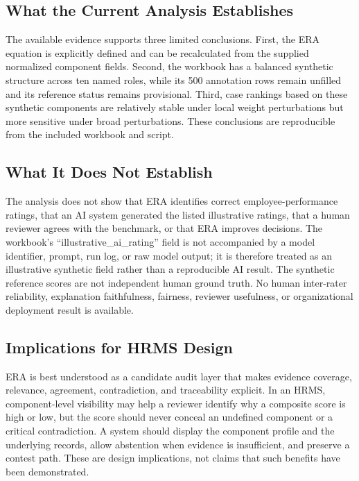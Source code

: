 \documentclass[
  10pt,
  runningheads]{llncs}
\begin{document}
\subsection{What the Current Analysis
Establishes}\label{what-the-current-analysis-establishes}

The available evidence supports three limited conclusions. First, the
ERA equation is explicitly defined and can be recalculated from the
supplied normalized component fields. Second, the workbook has a
balanced synthetic structure across ten named roles, while its 500
annotation rows remain unfilled and its reference status remains
provisional. Third, case rankings based on these synthetic components
are relatively stable under local weight perturbations but more
sensitive under broad perturbations. These conclusions are reproducible
from the included workbook and script.

\subsection{What It Does Not
Establish}\label{what-it-does-not-establish}

The analysis does not show that ERA identifies correct
employee-performance ratings, that an AI system generated the listed
illustrative ratings, that a human reviewer agrees with the benchmark,
or that ERA improves decisions. The workbook's
``illustrative\_ai\_rating'' field is not accompanied by a model
identifier, prompt, run log, or raw model output; it is therefore
treated as an illustrative synthetic field rather than a reproducible AI
result. The synthetic reference scores are not independent human ground
truth. No human inter-rater reliability, explanation faithfulness,
fairness, reviewer usefulness, or organizational deployment result is
available.

\subsection{Implications for HRMS
Design}\label{implications-for-hrms-design}

ERA is best understood as a candidate audit layer that makes evidence
coverage, relevance, agreement, contradiction, and traceability
explicit. In an HRMS, component-level visibility may help a reviewer
identify why a composite score is high or low, but the score should
never conceal an undefined component or a critical contradiction. A
system should display the component profile and the underlying records,
allow abstention when evidence is insufficient, and preserve a contest
path. These are design implications, not claims that such benefits have
been demonstrated.
\end{document}
